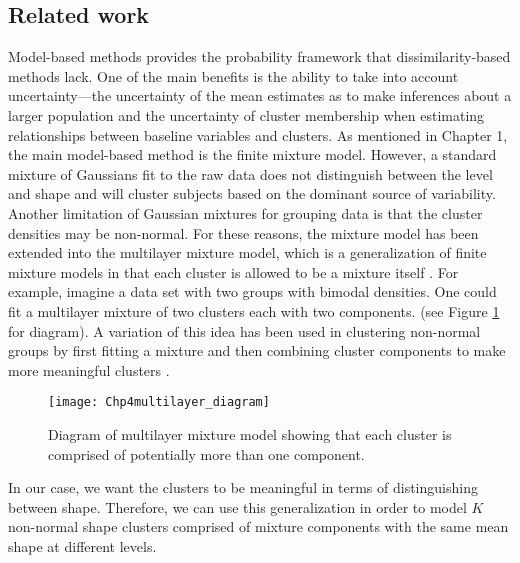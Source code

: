 \subsection{Related work}
Model-based methods provides the probability framework that dissimilarity-based methods lack. One of the main benefits is the ability to take into account uncertainty---the uncertainty of the mean estimates as to make inferences about a larger population and the uncertainty of cluster membership when estimating relationships between baseline variables and clusters. As mentioned in Chapter 1, the main model-based method is the finite mixture model. However, a standard mixture of Gaussians fit to the raw data does not distinguish between the level and shape and will cluster subjects based on the dominant source of variability. Another limitation of Gaussian mixtures for grouping data is that the cluster densities may be non-normal. For these reasons, the mixture model has been extended into the multilayer mixture model, which is a generalization of finite mixture models in that each cluster is allowed to be a mixture itself \cite{li2005}. For example, imagine a data set with two groups with bimodal densities. One could fit a multilayer mixture of two clusters each with two components. (see Figure \ref{fig:dia} for diagram). A variation of this idea has been used in clustering non-normal groups by first fitting a mixture and then combining cluster components to make more meaningful clusters \cite{hennig2010}. 
\begin{figure}[h]
\begin{center}
\texttt{[image: Chp4multilayer\_diagram]}
\end{center}
\label{fig:dia}
\caption{Diagram of multilayer mixture model showing that each cluster is comprised of potentially more than one component.}
\end{figure}

In our case, we want the clusters to be meaningful in terms of distinguishing between shape. Therefore, we can use this generalization in order to model $K$ non-normal shape clusters comprised of mixture components with the same mean shape at different levels.

